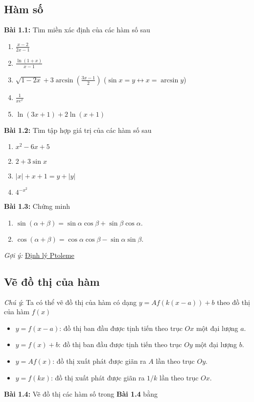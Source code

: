 \subsection*{Hàm số}
\textbf{Bài 1.1:} Tìm miền xác định của các hàm số sau
\begin{enumerate}[label=(\alph*)]
\item \(\frac{x-2}{2x-1}\)
\item \(\frac{\ln(1+x)}{x-1}\)
\item \(\sqrt{1-2x}+3\arcsin\left(\frac{3x-1}{2}\right)\) \quad (\(\sin{x}=y\leftrightarrow x=\arcsin y\))
\item \(\frac{1}{x e^x}\)
\item \(\ln{(3x+1)}+2\ln{(x+1)}\)
\end{enumerate}

\vspace{5pt}
\textbf{Bài 1.2:} Tìm tập hợp giá trị của các hàm số sau
\begin{enumerate}[label=(\alph*)]
\item \(x^2 -6x+5\)
\item \(2+3\sin x\)
\item \(|x| + x + 1 = y + |y|\)
\item \(4^{-x^2}\)
\end{enumerate}
\vspace{5pt}

\textbf{Bài 1.3:} Chứng minh
\begin{enumerate}[label=(\alph*)]
\item $\sin(\alpha+\beta)=\sin\alpha\cos\beta + \sin\beta\cos\alpha.$
\item $\cos(\alpha+\beta)=\cos\alpha\cos\beta - \sin\alpha\sin\beta.$
\end{enumerate}

\emph{Gợi ý:} \href{https://vi.wikipedia.org/wiki/%C4%90%E1%BB%8Bnh_l%C3%BD_Ptoleme}{Định lý Ptoleme}

\subsection*{Vẽ đồ thị của hàm}
\emph{Chú ý}: Ta có thể vẽ đồ thị của hàm có dạng $y=Af(k(x-a))+b$ theo đồ thị của hàm $f(x)$
\begin{itemize}
    \item $y=f(x-a)$: đồ thị ban đầu được tịnh tiến theo trục $Ox$ một đại lượng $a$.
    \item $y=f(x)+b$: đồ thị ban đầu được tịnh tiến theo trục $Oy$ một đại lượng $b$.
    \item $y=Af(x)$: đồ thị xuất phát được giãn ra $A$ lần theo trục $Oy$.
    \item $y=f(kx)$: đồ thị xuất phát được giãn ra $1/k$ lần theo trục $Ox$.
\end{itemize}
\textbf{Bài 1.4:} Vẽ đồ thị các hàm số trong \textbf{Bài 1.4} bằng

